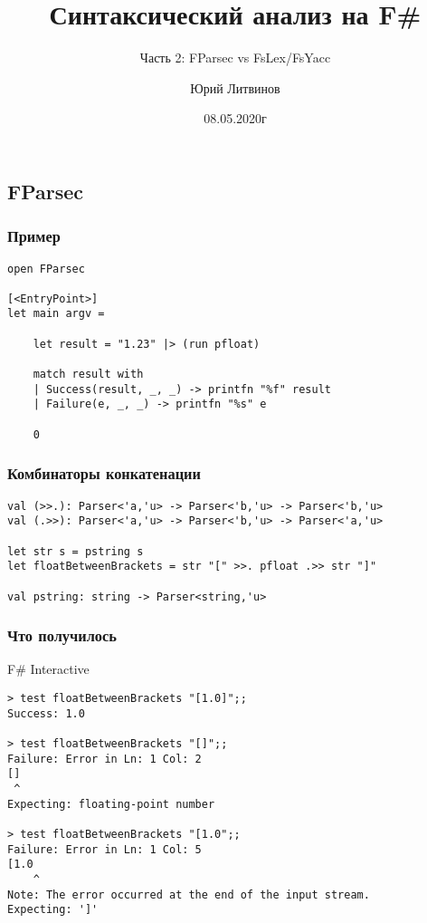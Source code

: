 \documentclass[xetex,mathserif,serif]{beamer}
\title{Синтаксический анализ на F\#}
\subtitle{Часть 2: FParsec vs FsLex/FsYacc}
\author{Юрий Литвинов}
\date{08.05.2020г}
\begin{document}
    
    \frame{\titlepage}

    \subsection{FParsec}

    \begin{frame}[fragile]
        \frametitle{Пример}
        \begin{verbatim}
open FParsec

[<EntryPoint>]
let main argv =

    let result = "1.23" |> (run pfloat)

    match result with
    | Success(result, _, _) -> printfn "%f" result
    | Failure(e, _, _) -> printfn "%s" e

    0
        \end{verbatim}
    \end{frame}

    \begin{frame}[fragile]
        \frametitle{Комбинаторы конкатенации}
        \begin{verbatim}
val (>>.): Parser<'a,'u> -> Parser<'b,'u> -> Parser<'b,'u>
val (.>>): Parser<'a,'u> -> Parser<'b,'u> -> Parser<'a,'u>

let str s = pstring s
let floatBetweenBrackets = str "[" >>. pfloat .>> str "]"

val pstring: string -> Parser<string,'u>
        \end{verbatim}
    \end{frame}

    \begin{frame}[fragile]
        \frametitle{Что получилось}
        \begin{small}
            \begin{alertblock}{F\# Interactive}
                \begin{verbatim}
> test floatBetweenBrackets "[1.0]";;
Success: 1.0

> test floatBetweenBrackets "[]";;
Failure: Error in Ln: 1 Col: 2
[]
 ^
Expecting: floating-point number

> test floatBetweenBrackets "[1.0";;
Failure: Error in Ln: 1 Col: 5
[1.0
    ^
Note: The error occurred at the end of the input stream.
Expecting: ']'
                \end{verbatim}
            \end{alertblock}
        \end{small}
    \end{frame}
\end{document}
